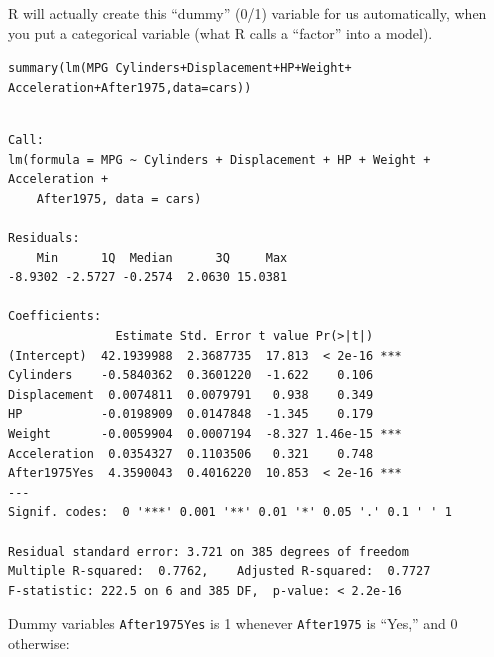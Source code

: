 \documentclass{beamer}\usepackage[]{graphicx}\usepackage[]{color}
\makeatletter
\newcommand{\hlopt}[1]{\textcolor[rgb]{1,0.894,0.769}{#1}}%
\newcommand{\hlstd}[1]{\textcolor[rgb]{1,0.894,0.769}{#1}}%
\newcommand{\hlkwc}[1]{\textcolor[rgb]{0.78,0.941,0.545}{#1}}%
\newcommand{\hlkwd}[1]{\textcolor[rgb]{1,0.78,0.769}{#1}}%
\newenvironment{kframe}{%
 \def\at@end@of@kframe{}%
 \ifinner\ifhmode%
  \def\at@end@of@kframe{\end{minipage}}%
  \begin{minipage}{\columnwidth}%
 \fi\fi%
 \def\FrameCommand##1{\hskip\@totalleftmargin \hskip-\fboxsep
 \colorbox{shadecolor}{##1}\hskip-\fboxsep
     \hskip-\linewidth \hskip-\@totalleftmargin \hskip\columnwidth}%
 \MakeFramed {\advance\hsize-\width
   \@totalleftmargin\z@ \linewidth\hsize
   \@setminipage}}%
 {\par\unskip\endMakeFramed%
 \at@end@of@kframe}
\newenvironment{knitrout}{}{} %
\makeatother
\begin{document}
\begin{darkframes}
    \begin{frame}
      \begin{center}
        R will actually create this ``dummy'' (0/1) variable for us automatically, when you put a categorical variable (what R calls a ``factor'' into a model).
      \end{center}
    \end{frame}

    \begin{frame}[fragile]
      \fontsm
\begin{knitrout}
\begin{kframe}
\begin{alltt}
\hlkwd{summary}\hlstd{(}\hlkwd{lm}\hlstd{(MPG} \hlopt{~} \hlstd{Cylinders} \hlopt{+} \hlstd{Displacement} \hlopt{+} \hlstd{HP} \hlopt{+} \hlstd{Weight} \hlopt{+}
    \hlstd{Acceleration} \hlopt{+} \hlstd{After1975,} \hlkwc{data}\hlstd{=cars))}
\end{alltt}
\begin{verbatim}

Call:
lm(formula = MPG ~ Cylinders + Displacement + HP + Weight + Acceleration + 
    After1975, data = cars)

Residuals:
    Min      1Q  Median      3Q     Max 
-8.9302 -2.5727 -0.2574  2.0630 15.0381 

Coefficients:
               Estimate Std. Error t value Pr(>|t|)    
(Intercept)  42.1939988  2.3687735  17.813  < 2e-16 ***
Cylinders    -0.5840362  0.3601220  -1.622    0.106    
Displacement  0.0074811  0.0079791   0.938    0.349    
HP           -0.0198909  0.0147848  -1.345    0.179    
Weight       -0.0059904  0.0007194  -8.327 1.46e-15 ***
Acceleration  0.0354327  0.1103506   0.321    0.748    
After1975Yes  4.3590043  0.4016220  10.853  < 2e-16 ***
---
Signif. codes:  0 '***' 0.001 '**' 0.01 '*' 0.05 '.' 0.1 ' ' 1

Residual standard error: 3.721 on 385 degrees of freedom
Multiple R-squared:  0.7762,	Adjusted R-squared:  0.7727 
F-statistic: 222.5 on 6 and 385 DF,  p-value: < 2.2e-16
\end{verbatim}
\end{kframe}
\end{knitrout}
    \end{frame}

    \begin{frame}[fragile]{Dummy variables}
      \texttt{After1975Yes} is 1 whenever \texttt{After1975} is ``Yes,'' and 0 otherwise:


\end{frame}
\end{darkframes}
\end{document}

